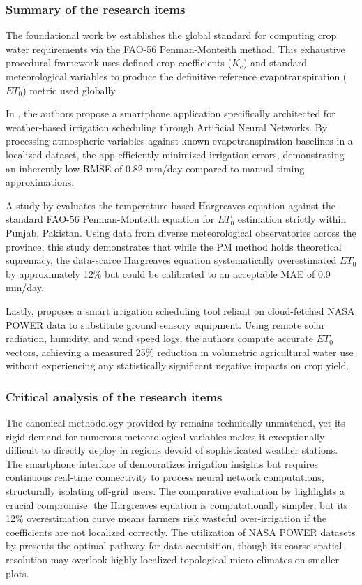 \subsubsection{Summary of the research items}
The foundational work by \cite{allen1998crop} establishes the global standard for computing crop water requirements via the FAO-56 Penman-Monteith method. This exhaustive procedural framework uses defined crop coefficients ($K_c$) and standard meteorological variables to produce the definitive reference evapotranspiration ($ET_0$) metric used globally.

In \cite{ferreira2020smartphone}, the authors propose a smartphone application specifically architected for weather-based irrigation scheduling through Artificial Neural Networks. By processing atmospheric variables against known evapotranspiration baselines in a localized dataset, the app efficiently minimized irrigation errors, demonstrating an inherently low RMSE of 0.82 mm/day compared to manual timing approximations.

A study by \cite{tariq2021evaluation} evaluates the temperature-based Hargreaves equation against the standard FAO-56 Penman-Monteith equation for $ET_0$ estimation strictly within Punjab, Pakistan. Using data from diverse meteorological observatories across the province, this study demonstrates that while the PM method holds theoretical supremacy, the data-scarce Hargreaves equation systematically overestimated $ET_0$ by approximately 12\% but could be calibrated to an acceptable MAE of 0.9 mm/day.

Lastly, \cite{navarro2022smart} proposes a smart irrigation scheduling tool reliant on cloud-fetched NASA POWER data to substitute ground sensory equipment. Using remote solar radiation, humidity, and wind speed logs, the authors compute accurate $ET_0$ vectors, achieving a measured 25\% reduction in volumetric agricultural water use without experiencing any statistically significant negative impacts on crop yield.

\subsubsection{Critical analysis of the research items}
The canonical methodology provided by \cite{allen1998crop} remains technically unmatched, yet its rigid demand for numerous meteorological variables makes it exceptionally difficult to directly deploy in regions devoid of sophisticated weather stations. The smartphone interface of \cite{ferreira2020smartphone} democratizes irrigation insights but requires continuous real-time connectivity to process neural network computations, structurally isolating off-grid users. The comparative evaluation by \cite{tariq2021evaluation} highlights a crucial compromise: the Hargreaves equation is computationally simpler, but its 12\% overestimation curve means farmers risk wasteful over-irrigation if the coefficients are not localized correctly. The utilization of NASA POWER datasets by \cite{navarro2022smart} presents the optimal pathway for data acquisition, though its coarse spatial resolution may overlook highly localized topological micro-climates on smaller plots.

